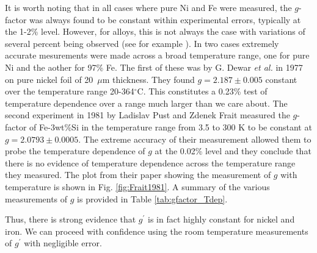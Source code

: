 \documentclass[12pt]{article}
\begin{document}
It is worth noting that in all cases where pure Ni and Fe were measured, the $g$-factor was always found to be constant within experimental errors, typically at the 1-2\% level. However, for alloys, this is not always the case with variations of several percent being observed (see for example \cite{Gadsden1978, Shanina1998}).
In two cases extremely accurate mesurements were made across a broad temperature range, one for pure Ni and the aother for 97\% Fe. The first of these was by G. Dewar {\it et al.} in 1977 on pure nickel foil of 20~$\mu$m thickness. They found $g=2.187\pm0.005$ constant over the temperature range 20-364$^{\circ}$C\cite{Dewar1977}. This constitutes a 0.23\% test of temperature dependence over a range much larger than we care about. The second experiment in 1981 by Ladislav Pust and Zdenek Frait measured the $g$-factor of Fe-3wt\%Si in the temperature range from 3.5 to 300 K to be constant at $g=2.0793\pm0.0005$\cite{Pust1981}. The extreme accuracy of their measurement allowed them to probe the temperature dependence of $g$ at the 0.02\% level and they conclude that there is no evidence of temperature dependence across the temperature range they measured. The plot from their paper showing the measurement of $g$ with temperature is shown in Fig. \ref{fig:Frait1981}. A summary of the various measurements of $g$ is provided in Table \ref{tab:gfactor_Tdep}.

Thus, there is strong evidence that $g^{\prime}$ is in fact highly constant for nickel and iron. We can proceed with confidence using the room temperature measurements of $g^{\prime}$ with negligible error.
\end{document}
